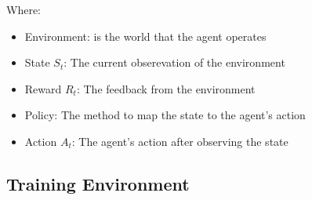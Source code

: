 \documentclass[ %
                    author={Ashwinder Khurana},
                supervisor={Prof Dave Cliff},
                    degree={MEng},
                     title={The Deeply Reinforced Trader},
                  subtitle={},
                      type={enterprise},
                      year={2020} ]{dissertation}
\begin{document}
{\begin{figure}[H]
\label{fig:RL-arch}  
\end{figure}

\noindent
Where:
\begin{itemize}
\item Environment: is the world that the agent operates 
\item State $S_t$: The current obserevation of the environment
\item Reward $R_t$: The feedback from the environment
\item Policy: The method to map the state to the agent's action 
\item Action $A_t$: The agent's action after observing the state
\end{itemize}

\vspace{0.5cm}


\subsection{Training Environment}

}
\end{document}
